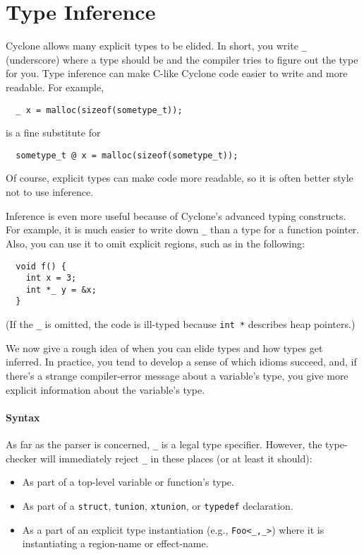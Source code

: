 \section{Type Inference}
\hypertarget{type_inference_sec}{}

Cyclone allows many explicit types to be elided.  In short, you write
\texttt{_} (underscore) where a type should be and the compiler tries to
figure out the type for you.  Type inference can make C-like Cyclone
code easier to write and more readable.  For example,
\begin{verbatim}
  _ x = malloc(sizeof(sometype_t));
\end{verbatim}
is a fine substitute for
\begin{verbatim}
  sometype_t @ x = malloc(sizeof(sometype_t));
\end{verbatim}
Of course, explicit types can make code more readable, so it is often
better style not to use inference.

Inference is even more useful because of Cyclone's advanced typing
constructs.  For example, it is much easier to write down \texttt{_}
than a type for a function pointer.  Also, you can use it to omit
explicit regions, such as in the following:
\begin{verbatim}
  void f() {
    int x = 3;
    int *_ y = &x;
  }
\end{verbatim}
(If the \texttt{_} is omitted, the code is ill-typed because
\texttt{int *} describes heap pointers.)

We now give a rough idea of when you can elide types and how types get
inferred.  In practice, you tend to develop a sense of which idioms
succeed, and, if there's a strange compiler-error message about a
variable's type, you give more explicit information about the
variable's type.

\paragraph{Syntax}
As far as the parser is
concerned, \texttt{_} is a legal type specifier.  However, the type-checker
will immediately reject \texttt{_} in these places (or at least it
should):

\begin{itemize}
\item As part of a top-level variable or function's type.
\item As part of a \texttt{struct}, \texttt{tunion}, \texttt{xtunion}, or
  \texttt{typedef} declaration.
\item As a part of an explicit type instantiation (e.g., \texttt{Foo<_,_>}) where
  it is instantiating a region-name or effect-name.
\end{itemize}

